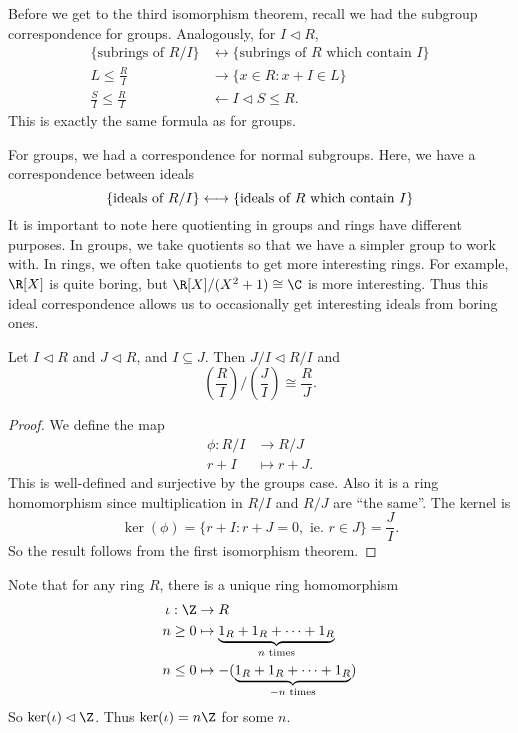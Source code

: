\documentclass[a4paper]{article}
\begin{document}
Before we get to the third isomorphism theorem, recall we had the subgroup correspondence for groups. Analogously, for $I \lhd R$,
\begin{align*}
  \{\text{subrings of }R/I\} &\longleftrightarrow\{\text{subrings of }R\text{ which contain }I\}\\
  L \leq \frac{R}{I} &\longrightarrow \{x \in R: x + I \in L\}\\
  \frac{S}{I} \leq \frac{R}{I} &\longleftarrow I \lhd S \leq R.
\end{align*}
This is exactly the same formula as for groups.

For groups, we had a correspondence for normal subgroups. Here, we have a correspondence between ideals
\[
  \{\text{ideals of }R/I\} \longleftrightarrow\{\text{ideals of }R\text{ which contain }I\}\\
\]
It is important to note here quotienting in groups and rings have different purposes. In groups, we take quotients so that we have a simpler group to work with. In rings, we often take quotients to get more interesting rings. For example, $\R[X]$ is quite boring, but $\R[X]/(X^2 + 1) \cong \C$ is more interesting. Thus this ideal correspondence allows us to occasionally get interesting ideals from boring ones.

\begin{thm}
  Let $I \lhd R$ and $J \lhd R$, and $I \subseteq J$. Then $J / I \lhd R/I$ and
  \[
    \left(\frac{R}{I}\right) \big/ \left(\frac{J}{I}\right) \cong \frac{R}{J}.
  \]
\end{thm}

\begin{proof}
  We define the map
  \begin{align*}
    \phi: R/I &\to R/J\\
    r + I &\mapsto r + J.
  \end{align*}
  This is well-defined and surjective by the groups case. Also it is a ring homomorphism since multiplication in $R/I$ and $R/J$ are ``the same''. The kernel is
  \[
    \ker(\phi) = \{r + I: r + J = 0,\text{ ie. } r \in J\} = \frac{J}{I}.
  \]
  So the result follows from the first isomorphism theorem.
\end{proof}

Note that for any ring $R$, there is a unique ring homomorphism
\begin{align*}
  \iota: \Z &\to R\\
  n \geq 0 &\mapsto \underbrace{1_R + 1_R + \cdots + 1_R}_{n\text{ times}}\\
  n \leq 0 &\mapsto -(\underbrace{1_R + 1_R + \cdots + 1_R}_{-n\text{ times}})
\end{align*}
So $\ker(\iota) \lhd \Z$. Thus $\ker(\iota) = n\Z$ for some $n$.
\end{document}
